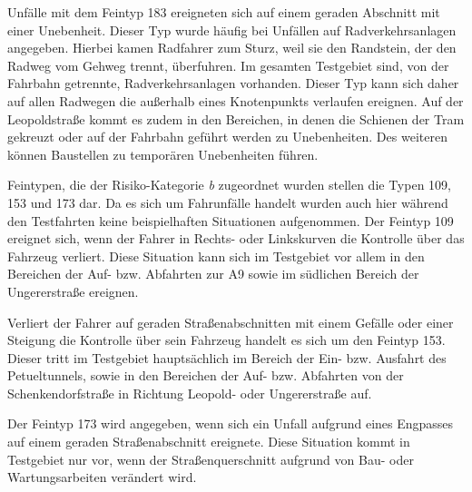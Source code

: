 Unfälle mit dem Feintyp 183 ereigneten sich auf einem geraden Abschnitt mit einer Unebenheit. Dieser Typ wurde häufig bei Unfällen auf Radverkehrsanlagen angegeben. Hierbei kamen Radfahrer zum Sturz, weil sie den Randstein, der den Radweg vom Gehweg trennt, überfuhren. Im gesamten Testgebiet sind, von der Fahrbahn getrennte, Radverkehrsanlagen vorhanden. Dieser Typ kann sich daher auf allen Radwegen die außerhalb eines Knotenpunkts verlaufen ereignen. Auf der Leopoldstraße kommt es zudem in den Bereichen, in denen die Schienen der Tram gekreuzt oder auf der Fahrbahn geführt werden zu Unebenheiten. Des weiteren können Baustellen zu temporären Unebenheiten führen.

Feintypen, die der Risiko-Kategorie \textit{b} zugeordnet wurden stellen die Typen 109, 153 und 173 dar. Da es sich um Fahrunfälle handelt wurden auch hier während den Testfahrten keine beispielhaften Situationen aufgenommen. Der Feintyp 109 ereignet sich, wenn der Fahrer in Rechts- oder Linkskurven die Kontrolle über das Fahrzeug verliert. Diese Situation kann sich im Testgebiet vor allem in den Bereichen der Auf- bzw. Abfahrten zur A9 sowie im südlichen Bereich der Ungererstraße ereignen.

Verliert der Fahrer auf geraden Straßenabschnitten mit einem Gefälle oder einer Steigung die Kontrolle über sein Fahrzeug handelt es sich um den Feintyp 153. Dieser tritt im Testgebiet hauptsächlich im Bereich der Ein- bzw. Ausfahrt des Petueltunnels, sowie in den Bereichen der Auf- bzw. Abfahrten von der Schenkendorfstraße in Richtung Leopold- oder Ungererstraße auf.

Der Feintyp 173 wird angegeben, wenn sich ein Unfall aufgrund eines Engpasses auf einem geraden Straßenabschnitt ereignete. Diese Situation kommt in Testgebiet nur vor, wenn der Straßenquerschnitt aufgrund von Bau- oder Wartungsarbeiten verändert wird.

